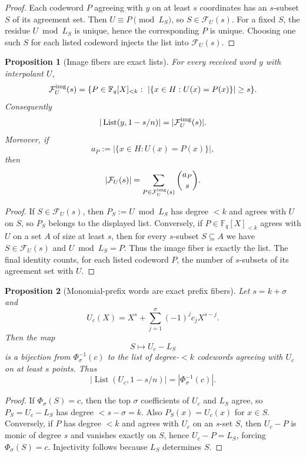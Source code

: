 \documentclass[11pt]{article}
\newtheorem{proposition}[proposition]{Proposition}
\theoremstyle{definition}
\newcommand{\F}{\mathbb F}
\newcommand{\Fib}{\mathcal F}
\newcommand{\ImgFib}{\mathcal F^{\rm img}}
\newcommand{\List}{\operatorname{List}}
\begin{document}
\begin{proof}
Each codeword $P$ agreeing with $y$ on at least $s$ coordinates has an $s$-subset $S$ of its agreement set.  Then $U\equiv P\pmod{L_S}$, so $S\in\Fib_U(s)$.  For a fixed $S$, the residue $U\bmod L_S$ is unique, hence the corresponding $P$ is unique.  Choosing one such $S$ for each listed codeword injects the list into $\Fib_U(s)$.
\end{proof}

\begin{proposition}[Image fibers are exact lists]\label{prop:imgfib-list}
For every received word $y$ with interpolant $U$,
\[
        \ImgFib_U(s)
        =
        \{P\in\F_q[X]_{<k}:\ |\{x\in H:U(x)=P(x)\}|\ge s\}.
\]
Consequently
\[
        |\List(y,1-s/n)|=|\ImgFib_U(s)|.
\]
Moreover, if
\[
        a_P:=|\{x\in H:U(x)=P(x)\}|,
\]
then
\[
        |\Fib_U(s)|
        =
        \sum_{P\in\ImgFib_U(s)}\binom{a_P}{s}.
\]
\end{proposition}

\begin{proof}
If $S\in\Fib_U(s)$, then $P_S:=U\bmod L_S$ has degree $<k$ and agrees with $U$
on $S$, so $P_S$ belongs to the displayed list.  Conversely, if
$P\in\F_q[X]_{<k}$ agrees with $U$ on a set $A$ of size at least $s$, then for
every $s$-subset $S\subseteq A$ we have $S\in\Fib_U(s)$ and
$U\bmod L_S=P$.  Thus the image fiber is exactly the list.  The final identity
counts, for each listed codeword $P$, the number of $s$-subsets of its agreement
set with $U$.
\end{proof}

\begin{proposition}[Monomial-prefix words are exact prefix fibers]\label{prop:monomial-fiber}
Let $s=k+\sigma$ and
\[
        U_c(X)=X^s+\sum_{j=1}^{\sigma}(-1)^jc_jX^{s-j}.
\]
Then the map
\[
        S\longmapsto U_c-L_S
\]
is a bijection from $\Phi_\sigma^{-1}(c)$ to the list of degree-$<k$ codewords agreeing with $U_c$ on at least $s$ points.  Thus
\[
        |\List(U_c,1-s/n)|=|\Phi_\sigma^{-1}(c)|.
\]
\end{proposition}

\begin{proof}
If $\Phi_\sigma(S)=c$, then the top $\sigma$ coefficients of $U_c$ and $L_S$ agree, so $P_S=U_c-L_S$ has degree $<s-\sigma=k$.  Also $P_S(x)=U_c(x)$ for $x\in S$.  Conversely, if $P$ has degree $<k$ and agrees with $U_c$ on an $s$-set $S$, then $U_c-P$ is monic of degree $s$ and vanishes exactly on $S$, hence $U_c-P=L_S$, forcing $\Phi_\sigma(S)=c$.  Injectivity follows because $L_S$ determines $S$.
\end{proof}
\end{document}
